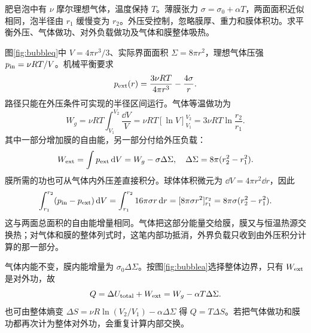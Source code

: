 \begin{example}[封闭肥皂泡的等温膨胀]
肥皂泡中有 $\nu$ 摩尔理想气体，温度保持 $T$。薄膜张力 $\sigma=\sigma_0+\alpha T$，两面面积近似相同，泡半径由 $r_1$ 缓慢变为 $r_2$。外压受控制，忽略膜厚、重力和膜体积功。求平衡外压、气体做功、对外负载做功及气体和膜整体吸热。
\end{example}
\begin{solution}
图\ref{fig:bubbleq}中 $V=4\pi r^3/3$、实际界面面积 $\Sigma=8\pi r^2$，理想气体压强 $p_{\rm in}=\nu RT/V$。机械平衡要求
\[
 p_{\rm ext}(r)=\frac{3\nu RT}{4\pi r^3}-\frac{4\sigma}{r}.
\]
路径只能在外压条件可实现的半径区间运行。气体等温做功为
\[
 W_g=\nu RT\int_{V_1}^{V_2}\frac{\dd V}{V}
 =\nu RT[\ln V]_{V_1}^{V_2}=3\nu RT\ln\frac{r_2}{r_1}.
\]
其中一部分增加膜的自由能，另一部分付给外压负载：
\[
 W_{\rm ext}=\int p_{\rm ext}\mathop{}\!\mathrm d V
 =W_g-\sigma\Delta\Sigma,
 \quad \Delta\Sigma=8\pi(r_2^2-r_1^2).
\]
膜所需的功也可从气体内外压差直接积分。球体体积微元为 $\dd V=4\pi r^2\dd r$，因此
\[
 \int_{r_1}^{r_2}(p_{\rm in}-p_{\rm ext})\mathop{}\!\mathrm d V
 =\int_{r_1}^{r_2}16\pi\sigma r\mathop{}\!\mathrm d r
 =[8\pi\sigma r^2]_{r_1}^{r_2}=8\pi\sigma(r_2^2-r_1^2).
\]
这与两面总面积的自由能增量相同。气体把这部分能量交给膜，膜又与恒温热源交换热；对气体和膜的整体列式时，这笔内部功抵消，外界负载只收到由外压积分计算的那一部分。

气体内能不变，膜内能增量为 $\sigma_0\Delta\Sigma$。按图\ref{fig:bubblea}选择整体边界，只有 $W_{\rm ext}$ 是对外功，故
\[
 Q=\Delta U_{\rm total}+W_{\rm ext}
 =W_g-\alpha T\Delta\Sigma.
\]
也可由整体熵变 $\Delta S=\nu R\ln(V_2/V_1)-\alpha\Delta\Sigma$ 得 $Q=T\Delta S$。若把气体做功和膜功都再次计为整体对外功，会重复计算内部交换。
\end{solution}


